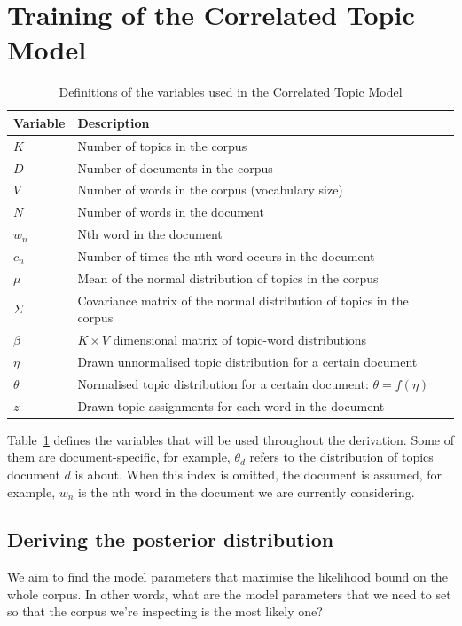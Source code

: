 \documentclass[12pt,a4paper,twoside,openright]{report}
\begin{document}
\section{Training of the Correlated Topic Model}

\begin{table}
\begin{tabular}{| l | l |}
\hline
Variable & Description \\
\hline
$K$ & Number of topics in the corpus \\
$D$ & Number of documents in the corpus \\
$V$ & Number of words in the corpus (vocabulary size) \\
$N$ & Number of words in the document \\
$w_n$ & Nth word in the document \\
$c_n$ & Number of times the nth word occurs in the document \\
$\mu$ & Mean of the normal distribution of topics in the corpus \\
$\Sigma$ & Covariance matrix of the normal distribution of topics in the corpus \\
$\beta$ & $K \times V$ dimensional matrix of topic-word distributions \\
$\eta$ & Drawn unnormalised topic distribution for a certain document \\
$\theta$ & Normalised topic distribution for a certain document: $\theta = f(\eta)$ \\
$z$ & Drawn topic assignments for each word in the document \\
\hline
\end{tabular}
\caption{Definitions of the variables used in the Correlated Topic Model}
\label{tab:ctm-variables}
\end{table}

Table~\ref{tab:ctm-variables} defines the variables that will be used throughout the derivation. Some of them are document-specific, for example, $\theta_d$ refers to the distribution of topics document $d$ is about. When this index is omitted, the document is assumed, for example, $w_n$ is the nth word in the document we are currently considering.

\subsection{Deriving the posterior distribution}

We aim to find the model parameters that maximise the likelihood bound on the whole corpus. In other words, what are the model parameters that we need to set so that the corpus we're inspecting is the most likely one?
\end{document}
